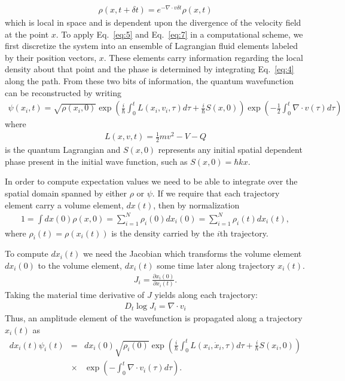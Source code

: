 \begin{eqnarray}
\rho (x,t+\delta t) = e^{-\nabla \cdot v\delta t} \rho(x,t)\label{eq:7}
\end{eqnarray}
which is local in space and is dependent upon the divergence of the 
velocity field at the point $x$.  To apply Eq.~\ref{eq:5} and 
Eq.~\ref{eq:7} in a computational scheme, we first discretize the 
system into an ensemble of Lagrangian fluid elements labeled by their 
position vectors, $x$.  These elements carry information regarding the 
local density about that point and the phase is determined by 
integrating Eq.~\ref{eq:4} along the path.  From these two bits of 
information, the quantum wavefunction can be reconstructed by writing 
\cite{ref17}
\begin{eqnarray}
\psi (x_i,t) ={\sqrt{\rho (x_i,0)}}
\exp\left(\frac{i}{\hbar}\int _{0}^{t}L({x_i},{v_i},\tau )d\tau
+\frac{i}{\hbar}S(x,0)\right)
\exp\left(-\frac{1}{2}\int_{0}^{t}\nabla \cdot v(\tau )d\tau\right)
\label{eq:9}
\end{eqnarray}
where 
\begin{eqnarray}
L(x,v,t)   =   \frac{1}{2}m   {v^2}   -   V   -   Q   \label{eq:10}
\end{eqnarray}
is the quantum Lagrangian and $S(x,0)$ represents any initial spatial 
dependent phase present in the initial wave function, such as $S(x,0) 
= \hbar kx$.

In order to compute expectation values we need to be able to integrate 
over the spatial domain spanned by either $\rho$ or $\psi$.  If we 
require that each trajectory element carry a volume element, $dx(t)$, 
then by normalization
\begin{eqnarray}
1=\int dx(0)\rho(x,0)   =   \sum_{i=1}^{N}\rho_i(0)dx_i(0)
=\sum_{i=1}^{N}\rho_i(t)dx_i(t),\label{eq:11}
\end{eqnarray}
where $\rho_i(t)=\rho(x_i(t))$ is the density carried by the $i$th trajectory.

To compute $dx_i(t)$ we need the Jacobian which transforms the volume 
element $dx_i(0)$ to the volume element, $dx_i(t)$ some time later 
along trajectory $x_i(t)$.
\begin{eqnarray}
J_i =\frac{\partial {x_i}(0)}{\partial {x_i}(t)}. \label{eq:12}
\end{eqnarray}
Taking the material time derivative of $J$ yields along each trajectory:
\begin{eqnarray}
D_t\log J_i   =   \nabla \cdot v_i\label{eq:13}
\end{eqnarray}
Thus, an amplitude element of the wavefunction is propagated along a 
trajectory $x_i(t)$ as
\begin{eqnarray}
dx_i(t)\psi_i(t) &=&
dx_i(0)
\sqrt{\rho_i(0)}
\exp\left(\frac{i}{\hbar}\int_{0}^{t}L({x_i},\dot{x}_i,\tau )d\tau +\frac{i}{\hbar}S(x_i,0)\right)  
\nonumber \\
&\times& \exp\left(-\int_{0}^{t}\nabla \cdot v_i(\tau)d\tau\right).
\label{eq:14}
\end{eqnarray}

